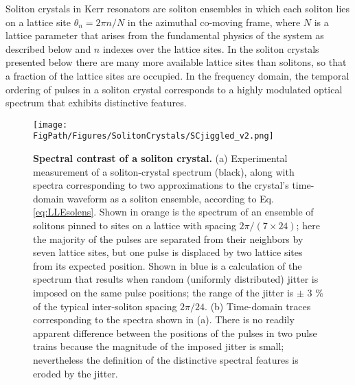 Soliton crystals in Kerr resonators are soliton ensembles in which each soliton lies on a lattice site $\theta_n= 2\pi n/N$ in the azimuthal co-moving frame, where $N$ is a lattice parameter that arises from the fundamental physics of the system as described below and $n$ indexes over the lattice sites. In the soliton crystals presented below there are many more available lattice sites than solitons, so that a fraction of the lattice sites are occupied. In the frequency domain, the temporal ordering of pulses in a soliton crystal corresponds to a highly modulated optical spectrum that exhibits distinctive features. 



\begin{figure}[htpb]
	\begin{center}
		\texttt{[image: \\FigPath/Figures/SolitonCrystals/SCjiggled\_v2.png]}
	\end{center}
	\caption[Spectral contrast of a soliton crystal]{\textbf{Spectral contrast of a soliton crystal.} (a) Experimental measurement of a soliton-crystal spectrum (black), along with spectra corresponding to two approximations to the crystal's time-domain waveform as a soliton ensemble, according to Eq. \ref{eq:LLEsolens}. Shown in orange is the spectrum of an ensemble of solitons pinned to sites on a lattice with spacing $2\pi/(7\times24)$; here the majority of the pulses are separated from their neighbors by seven lattice sites, but one pulse is displaced by two lattice sites from its expected position. Shown in blue is a calculation of the spectrum that results when random (uniformly distributed) jitter is imposed on the same pulse positions; the range of the jitter is $\pm$ 3 $\%$ of the typical inter-soliton spacing $2\pi/24$. (b) Time-domain traces corresponding to the spectra shown in (a). There is no readily apparent difference between the positions of the pulses in two pulse trains because the magnitude of the imposed jitter is small; nevertheless the definition of the distinctive spectral features is eroded by the jitter.}
	\label{fig:SCjiggled}
\end{figure} 

